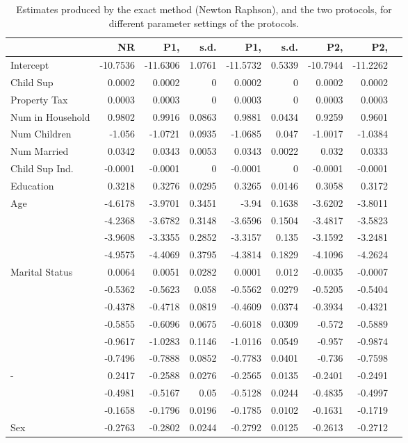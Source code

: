 \documentclass[11pt]{article}
\begin{document}
\begin{table}
\begin{tabular}{|l | r | r r | r  r |  r | r | r|}
\hline

& NR & P1,  & s.d. & P1,  & s.d. & P2,  & P2, \\
\hline
Intercept & -10.7536 & -11.6306 & 1.0761 & -11.5732 & 0.5339 & -10.7944 & -11.2262 \\ \hline
Child Sup &0.0002 &  0.0002 & 0 & 0.0002 & 0 & 0.0002 & 0.0002 \\ \hline
Property Tax & 0.0003 &  0.0003 & 0 & 0.0003 & 0 & 0.0003 & 0.0003 \\ \hline
Num in Household & 0.9802  & 0.9916 & 0.0863 & 0.9881 & 0.0434 & 0.9259 & 0.9601 \\\hline
Num Children & -1.056  & -1.0721 & 0.0935 & -1.0685 & 0.047 & -1.0017 & -1.0384 \\\hline
Num Married & 0.0342  & 0.0343 & 0.0053 & 0.0343 & 0.0022 & 0.032 & 0.0333 \\\hline
Child Sup Ind. & -0.0001  & -0.0001 & 0 & -0.0001 & 0 & -0.0001 & -0.0001 \\\hline
Education & 0.3218 & 0.3276 & 0.0295 & 0.3265 & 0.0146 & 0.3058 & 0.3172 \\\hline
\multirow{4}{*}{Age} & -4.6178  & -3.9701 & 0.3451 & -3.94 & 0.1638 & -3.6202 & -3.8011 \\
& -4.2368  & -3.6782 & 0.3148 & -3.6596 & 0.1504 & -3.4817 & -3.5823 \\
& -3.9608 & -3.3355 & 0.2852 & -3.3157 & 0.135 & -3.1592 & -3.2481 \\
& -4.9575 & -4.4069 & 0.3795 & -4.3814 & 0.1829 & -4.1096 & -4.2624 \\ \hline
\multirow{6}{*}{Marital Status} &  0.0064 & 0.0051 & 0.0282 & 0.0001 & 0.012 & -0.0035 & -0.0007 \\
& -0.5362 & -0.5623 & 0.058 & -0.5562 & 0.0279 & -0.5205 & -0.5404 \\
& -0.4378 & -0.4718 & 0.0819 & -0.4609 & 0.0374 & -0.3934 & -0.4321 \\
& -0.5855 & -0.6096 & 0.0675 & -0.6018 & 0.0309 & -0.572 & -0.5889 \\
& -0.9617 & -1.0283 & 0.1146 & -1.0116 & 0.0549 & -0.957 & -0.9874 \\
& -0.7496& -0.7888 & 0.0852 & -0.7783 & 0.0401 & -0.736 & -0.7598 \\ \hline
-\multirow{3}{*}{Race} & 0.2417 & -0.2588 & 0.0276 & -0.2565 & 0.0135 & -0.2401 & -0.2491 \\
& -0.4981 & -0.5167 & 0.05 & -0.5128 & 0.0244 & -0.4835 & -0.4997 \\
& -0.1658 & -0.1796 & 0.0196 & -0.1785 & 0.0102 & -0.1631 & -0.1719 \\ \hline
Sex & -0.2763 & -0.2802 & 0.0244 & -0.2792 & 0.0125 & -0.2613 & -0.2712 \\
\hline
\end{tabular}
\caption{Estimates produced by the exact method (Newton Raphson), and the two protocols, for different parameter settings of the protocols.}
\label{tab:protocol2}
\end{table}
\end{document}
